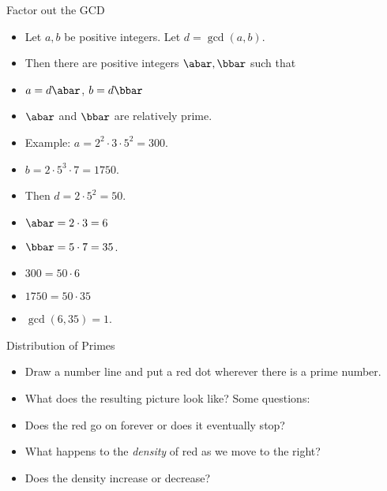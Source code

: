 \documentclass{beamer}
\begin{document}
\begin{frame}{Factor out the GCD}

\begin{itemize}
  \item Let $a,b$ be positive integers. Let $d=\gcd(a,b)$.
  \item Then there are positive integers $\abar,\bbar$ such that
  \item $a=d\abar$, $b=d\bbar$
  \item $\abar$ and $\bbar$ are relatively prime.
  \item Example: $a=2^2\cdot 3 \cdot 5^2 = 300$.
  \item $b=2 \cdot 5^3 \cdot 7 =1750$.
  \item Then $d=2\cdot 5^2 = 50$.
  \item $\abar = 2\cdot 3 = 6$
  \item $\bbar = 5 \cdot 7 = 35$.
  \item $300 = 50 \cdot 6$
  \item $1750 = 50 \cdot 35$
  \item $\gcd(6,35) = 1$.
\end{itemize}

\end{frame}

\begin{frame}{Distribution of Primes}

\begin{itemize}
  \item Draw a number line and put a red dot wherever there is a prime number.
  \item What does the resulting picture look like? Some questions:
  \item Does the red go on forever or does it eventually stop?
  \item What happens to the \emph{density} of red as we move to the right?
  \item Does the density increase or decrease?
\end{itemize}

\end{frame}
\end{document}
